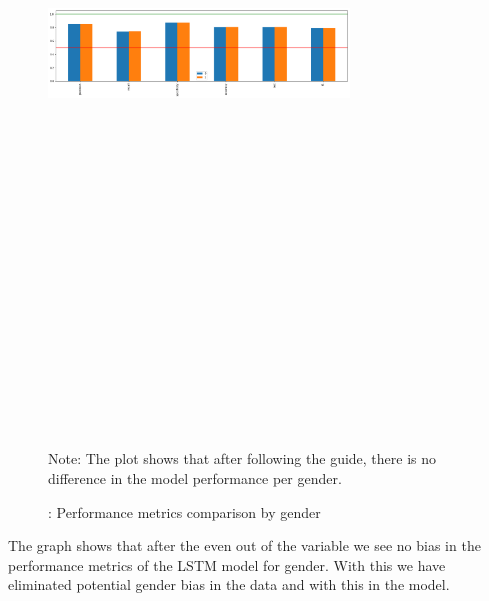 \documentclass[jou,apacite]{apa6}
\begin{document}
\begin{figure}[]
  \includegraphics[angle=90, width=8cm, height=20cm]{genderperformancesplit.png}
  \caption{: Performance metrics comparison by gender}
    \medskip %
    \begin{minipage}{0.45\textwidth} %
    {\footnotesize Note: The plot shows that after following the guide, there is no difference in the model performance per gender.\par}
    \end{minipage}
  \label{sch:perform}
\end{figure}

The graph shows that after the even out of the variable we see no bias in the performance metrics of the LSTM model for gender. With this we have eliminated potential gender bias in the data and with this in the model. \par
\end{document}
